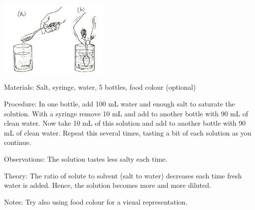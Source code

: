 \begin{multicols}{2}
\begin{center}
\includegraphics[width=0.4\textwidth]{./img/source/dilution.jpg}
\end{center}

\begin{description*}
\item[Materials:]{Salt, syringe, water, 5 bottles, food colour (optional)}
\item[Procedure:]{In one bottle, add 100 mL water and enough salt to saturate the solution. With a syringe remove 10 mL and add to another bottle with 90 mL of clean water. Now take 10 mL of this solution and add to another bottle with 90 mL of clean water. Repeat this several times, tasting a bit of each solution as you continue.}
\item[Observations:]{The solution tastes less salty each time.}
\item[Theory:]{The ratio of solute to solvent (salt to water) decreases each time fresh water is added. Hence, the solution becomes more and more diluted.}
\item[Notes:]{Try also using food colour for a visual representation.}
\end{description*}

%
%


\end{multicols}

\pagebreak